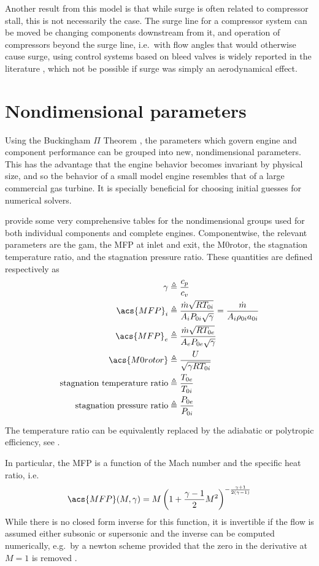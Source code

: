 Another result from this model is that while surge is often related to compressor stall, this is not necessarily the case.
The surge line for a compressor system can be moved be changing components downstream from it, and operation of compressors beyond the surge line, i.e.\ with flow angles that would otherwise cause surge, using control systems based on bleed valves is widely reported in the literature \cite[e.g.][]{Liaw2004}, which not be possible if surge was simply an aerodynamical effect.

\section{Nondimensional parameters}
\label{sec:nondimensional}

Using the Buckingham $\Pi$ Theorem \cite{Buckingham1914},
the parameters which govern engine and component performance can be grouped into new, nondimensional parameters. 
This has the advantage that the engine behavior becomes invariant by physical size, and so the behavior of a small model engine resembles that of a large commercial gas turbine. 
It is specially beneficial for choosing initial guesses for numerical solvers.

\textcite[chapter 4]{walsh2004gas} provide some very comprehensive tables 
for the nondimensional groups used for both individual components and complete engines.
Componentwise, the relevant parameters are the \acl{gam}, the \acl{MFP} at inlet and exit, 
the \acl{M0rotor}, the stagnation temperature ratio, and the stagnation pressure ratio. 
These quantities are defined respectively as
\begin{align}
    \gamma &\triangleq \frac{c_p}{c_v} \\
    \acs{MFP}_i &\triangleq \MFP{i} = \MFPalt{i} \label{eqn:MFPi}\\
    \acs{MFP}_e &\triangleq \MFP{e} \\
    \acs{M0rotor} &\triangleq \frac{U}{\sqrt{\gamma R T_{0i}}} \\
    \text{stagnation temperature ratio}&\triangleq\tr{0e}{0i} \\
    \text{stagnation pressure ratio}&\triangleq\pr{0e}{0i}
\end{align}

The temperature ratio can be equivalently replaced by the adiabatic or polytropic efficiency,
see .

In particular, the \acl{MFP} is a function of the Mach number and the specific heat ratio,
 i.e.\
\begin{equation}
    \label{eqn:mfp2mach}
    \acs{MFP}(M,\gamma) = M \left( 1 + \frac{\gamma-1}{2}M^2\right)^{-\frac{\gamma+1}{2(\gamma-1)}}
\end{equation}
While there is no closed form inverse for this function, it is invertible if the flow is assumed either subsonic or supersonic and the inverse can be computed numerically, e.g.\ by a newton scheme provided that the zero in the derivative at $M=1$ is removed \cite{Der1974}.


